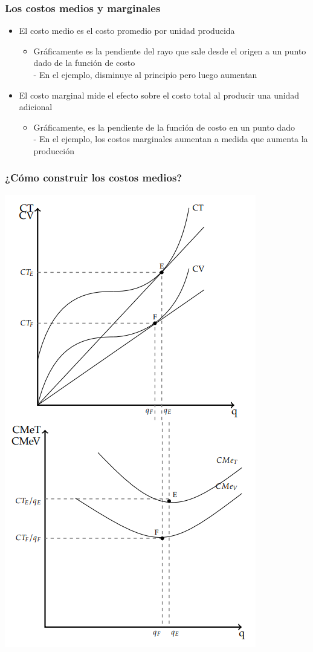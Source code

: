 \documentclass{beamer}
\begin{document}
\begin{frame}
\frametitle{Los costos medios y marginales}
\begin{itemize}
    \item El costo medio es el costo promedio por unidad producida
    \begin{itemize}
        \item Gráficamente es la pendiente del rayo que sale desde el origen a un punto dado de la función de costo \\
        - En el ejemplo, disminuye al principio pero luego aumentan 
    \end{itemize}
    \item El costo marginal mide el efecto sobre el costo total al producir una unidad adicional
    \begin{itemize}
        \item Gráficamente, es la pendiente de la función de costo en un punto dado \\
        - En el ejemplo, los costos marginales aumentan a medida que aumenta la producción
    \end{itemize}
\end{itemize}
\end{frame}

\begin{frame}
\frametitle{¿Cómo construir los costos medios?}
\centering
\includegraphics[scale=0.4]{../Figures/C13.6.png}
\end{frame}
\end{document}
